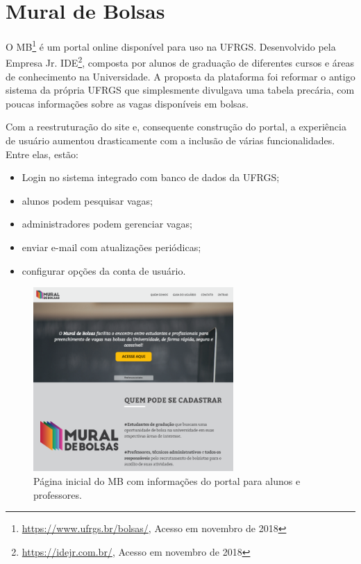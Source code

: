 \section{Mural de Bolsas}
\label{trabRelMDB}

O MB\footnote{{\url{https://www.ufrgs.br/bolsas/}, Acesso em novembro de 2018}} é um portal online disponível para uso na UFRGS. Desenvolvido pela Empresa Jr. IDE\footnote{{\url{https://idejr.com.br/}, Acesso em novembro de 2018}}, composta por alunos de graduação de diferentes cursos e áreas de conhecimento na Universidade. A proposta da plataforma foi reformar o antigo sistema da própria UFRGS que simplesmente divulgava uma tabela precária, com poucas informações sobre as vagas disponíveis em bolsas. 

Com a reestruturação do site e, consequente construção do portal, a experiência de usuário aumentou drasticamente  com a inclusão de várias funcionalidades. Entre elas, estão:
\begin{itemize}
    \item Login no sistema integrado com banco de dados da UFRGS;
    \item alunos podem pesquisar vagas;
    \item administradores podem gerenciar vagas;
    \item enviar e-mail com atualizações periódicas;
    \item configurar opções da conta de usuário.
\end{itemize}

\begin{figure}[h]
    \caption{Página inicial do MB com informações do portal para alunos e professores.}
       	\begin{center}
            \includegraphics[width=0.68\textwidth]{figuras/rel06.png}
        \end{center}
    \label{telaHomeMB}
\end{figure}

